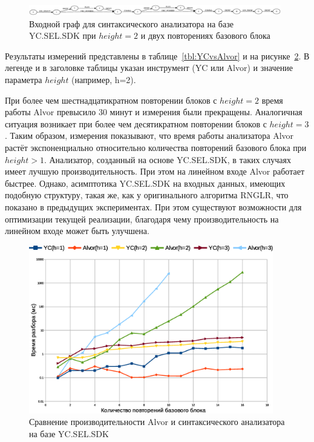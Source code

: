 \begin{figure}[h!]
 \centering
 \includegraphics[width=0.98\textwidth]{pics/ycSQLinput.eps}
 \caption{Входной граф для синтаксического анализатора на базе YC.SEL.SDK при $height=2$ и двух повторениях базового блока}
 \label{fig:YCInput}
\end{figure}

Результаты измерений представлены в таблице~\ref{tbl:YCvsAlvor} и на рисунке~\ref{fig:YCvsAlvor}. В легенде и в заголовке таблицы указан инструмент (YC или Alvor) и значение параметра $height$ (например, h=2).

При более чем шестнадцатикратном повторении блоков с $height=2$ время работы Alvor превысило 30 минут и измерения были прекращены. Аналогичная ситуация возникает при более чем десятикратном повторении блоков с $height=3$. Таким образом, измерения показывают, что время работы анализатора Alvor растёт экспоненциально относительно количества повторений базового блока при $height>1$. Анализатор, созданный на основе YC.SEL.SDK, в таких случаях имеет лучшую производительность. При этом на линейном входе Alvor работает быстрее. Однако, асимптотика YC.SEL.SDK на входных данных, имеющих подобную структуру, такая же, как у оригинального алгоритма RNGLR, что показано в предыдущих экспериментах. При этом существуют возможности для оптимизации текущей реализации, благодаря чему производительность на линейном входе может быть улучшена.

\begin{figure}[h!]
 \centering
 \includegraphics[width=0.95\textwidth]{pics/AlvorVsYC.eps}
 \caption{Сравнение производительности Alvor и синтаксического анализатора на базе YC.SEL.SDK}
 \label{fig:YCvsAlvor}
\end{figure}



